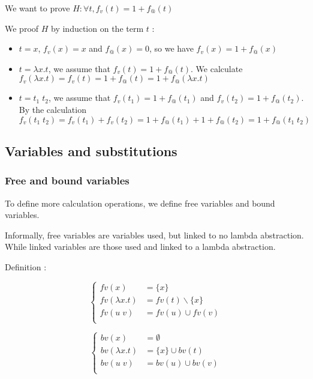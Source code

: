   \exam We want to prove $H : \forall t, f_v(t) = 1 + f_@(t) $

  \proof We proof $H$ by induction on the term $t$ :

  \begin{itemize}
    \item $t = x$, $f_v(x) = x$ and $f_@(x) = 0$, so we have $f_v(x) = 1 +
      f_@(x)$

    \item $t = \lambda x. t$, we assume that $f_v(t) = 1 + f_@(t)$.
      We calculate $f_v(\lambda x. t) = f_v(t) = 1 + f_@(t) = 1 + f_@(\lambda
      x.t)$

    \item $t = t_1\; t_2$, we assume that $f_v(t_1) = 1 + f_@(t_1)$ and
      $f_v(t_2) = 1 + f_@(t_2)$. By the calculation $f_v(t_1\; t_2) = f_v(t_1) +
      f_v(t_2) = 1 + f_@(t_1) + 1 + f_@(t_2) = 1 + f_@(t_1\; t_2)$
  \end{itemize}
  \qedsymbol

  \subsection{Variables and substitutions}

  \subsubsection{Free and bound variables}

  To define more calculation operations, we define free variables and bound
  variables.

  Informally, free variables are variables used, but linked to no lambda
  abstraction. While linked variables are those used and linked to a lambda
  abstraction.

  Definition :

  \begin{multicols}{2}
    \[
      \begin{cases}
        fv(x) &= \{x\} \\
        fv(\lambda x. t) &= fv(t)\backslash \{x\} \\
        fv(u\; v) &= fv(u) \cup fv(v) \\
      \end{cases}
    \]

    \[
      \begin{cases}
        bv(x) &= \emptyset \\
        bv(\lambda x. t) &= \{x\} \cup bv(t) \\
        bv(u\; v) &= bv(u) \cup bv(v) \\
      \end{cases}
    \]
  \end{multicols}

